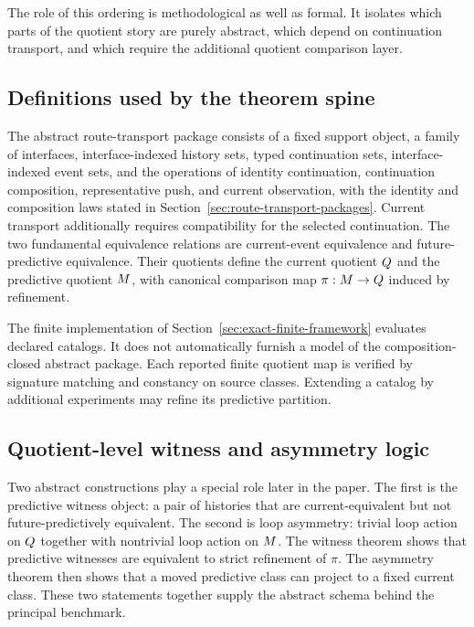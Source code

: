 \documentclass[11pt]{article}
\theoremstyle{definition}
\begin{document}
The role of this ordering is methodological as well as formal. It isolates which parts of the quotient story are purely abstract, which depend on continuation transport, and which require the additional quotient comparison layer.

\subsection{Definitions used by the theorem spine}\label{appsubsec:proof-definitions}
The abstract route-transport package consists of a fixed support object, a family of interfaces, interface-indexed history sets, typed continuation sets, interface-indexed event sets, and the operations of identity continuation, continuation composition, representative push, and current observation, with the identity and composition laws stated in Section~\ref{sec:route-transport-packages}. Current transport additionally requires compatibility for the selected continuation. The two fundamental equivalence relations are current-event equivalence and future-predictive equivalence. Their quotients define the current quotient $Q$ and the predictive quotient $M$, with canonical comparison map $\pi : M \to Q$ induced by refinement.

The finite implementation of Section~\ref{sec:exact-finite-framework} evaluates declared catalogs. It does not automatically furnish a model of the composition-closed abstract package. Each reported finite quotient map is verified by signature matching and constancy on source classes. Extending a catalog by additional experiments may refine its predictive partition.

\subsection{Quotient-level witness and asymmetry logic}\label{appsubsec:proof-witness-asymmetry}
Two abstract constructions play a special role later in the paper. The first is the predictive witness object: a pair of histories that are current-equivalent but not future-predictively equivalent. The second is loop asymmetry: trivial loop action on $Q$ together with nontrivial loop action on $M$. The witness theorem shows that predictive witnesses are equivalent to strict refinement of $\pi$. The asymmetry theorem then shows that a moved predictive class can project to a fixed current class. These two statements together supply the abstract schema behind the principal benchmark.
\end{document}
